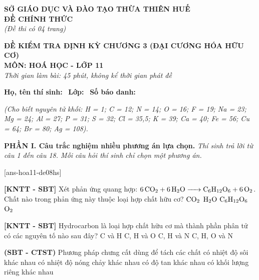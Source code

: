 \documentclass[12pt,a4paper]{article}
\begin{document}
\thispagestyle{firstpage}

\noindent
\begin{minipage}[t]{0.44\textwidth}
	\centering\fontsize{10pt}{12pt}\selectfont
	\textbf{SỞ GIÁO DỤC VÀ ĐÀO TẠO THỪA THIÊN HUẾ}\\
	\textbf{ĐỀ CHÍNH THỨC}\\
	\textit{(Đề thi có 04 trang)}
\end{minipage}\hfill
\begin{minipage}[t]{0.54\textwidth}
	\centering\fontsize{10.5pt}{13pt}\selectfont
	\textbf{ĐỀ KIỂM TRA ĐỊNH KỲ CHƯƠNG 3 (ĐẠI CƯƠNG HÓA HỮU CƠ)}\\
	\textbf{MÔN: HOÁ HỌC - LỚP 11}\\
	\textit{Thời gian làm bài: 45 phút, không kể thời gian phát đề}
	
	\smallskip
\end{minipage}

\smallskip
\noindent\hrulefill
\smallskip

\noindent\textbf{Họ, tên thí sinh:} \dotfill\ \textbf{Lớp:} \dotfill\ \textbf{Số báo danh:} \dotfill

\smallskip
\noindent\textit{(Cho biết nguyên tử khối: H = 1; C = 12; N = 14; O = 16; F = 19; Na = 23; Mg = 24; Al = 27; P = 31; S = 32; Cl = 35,5; K = 39; Ca = 40; Fe = 56; Cu = 64; Br = 80; Ag = 108).}
\smallskip

\noindent\textbf{\large PHẦN I. Câu trắc nghiệm nhiều phương án lựa chọn.}
\textit{Thí sinh trả lời từ câu 1 đến câu 18. Mỗi câu hỏi thí sinh chỉ chọn một phương án.}
\vspace{0.2cm}

[ans-hoa11-de08hs]

\begin{ex}
\textbf{[KNTT - SBT]} Xét phản ứng quang hợp: $\ce{6CO2 + 6H2O -> C6H12O6 + 6O2}$. Chất nào trong phản ứng này thuộc loại hợp chất hữu cơ?
\choice
{$\ce{CO2}$}
{$\ce{H2O}$}
{\True $\ce{C6H12O6}$}
{$\ce{O2}$}

\end{ex}

\begin{ex}
\textbf{[KNTT - SBT]} Hydrocarbon là loại hợp chất hữu cơ mà thành phần phân tử có các nguyên tố nào sau đây?
\choice
{\True C và H}
{C, H và O}
{C, H và N}
{C, H, O và N}

\end{ex}

\begin{ex}
\textbf{(SBT - CTST)} Phương pháp chưng cất dùng để tách các chất
\choice
{\True có nhiệt độ sôi khác nhau}
{có nhiệt độ nóng chảy khác nhau}
{có độ tan khác nhau}
{có khối lượng riêng khác nhau}

\end{ex}
\end{document}
